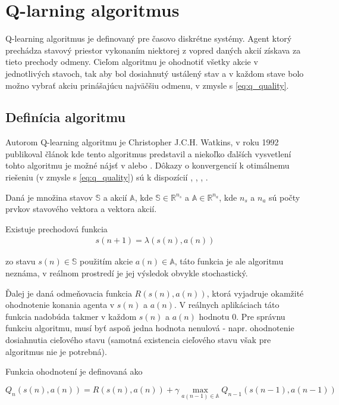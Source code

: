 \chapter{Q-larning algoritmus}

Q-learning algoritmus je definovaný pre časovo diskrétne systémy.
Agent ktorý prechádza stavový priestor vykonaním niektorej z vopred daných
akcií získava za tieto prechody odmeny. Cieľom algoritmu je ohodnotiť všetky akcie
v jednotlivých stavoch, tak aby bol dosiahnutý ustálený stav a v každom stave
bolo možno vybrať akciu prinášajúcu najväčšiu odmenu, v zmysle
s \ref{eq:q_quality}.


\section{Definícia algoritmu}

Autorom Q-learning algoritmu je Christopher J.C.H. Watkins, v roku 1992 publikoval
článok kde tento algoritmus predstavil \cite{bib:q_learning_watkins} a niekoľko ďalších
vysvetlení tohto algoritmu je možné nájsť v \cite{bib:q_tutorial_01} alebo
\cite{bib:q_tutorial_02}. Dôkazy o konvergencií k otimálnemu riešeniu (v zmysle
s \ref{eq:q_quality}) sú k dispozícií \cite{bib:q_proof_01}, \cite{bib:q_proof_02},
\cite{bib:q_proof_03}, \cite{bib:q_proof_04}.

Daná je množina stavov $\mathbb{S}$ a akcií $\mathbb{A}$, kde
 $\mathbb{S} \in \mathbb{R}^{n_s}$ a $\mathbb{A} \in \mathbb{R}^{n_a}$, kde
$n_s$ a  $n_a$ sú počty prvkov stavového vektora a vektora akcií.

Existuje prechodová funkcia
\begin{align}
        s(n+1) = \lambda(s(n), a(n))
\end{align}

zo stavu $s(n) \in \mathbb{S}$ použitím akcie $a(n) \in \mathbb{A}$, táto funkcia je ale algoritmu neznáma,
v reálnom prostredí je jej výsledok obvykle stochastický.

Ďalej je daná odmeňovacia funkcia $R(s(n),a(n))$, ktorá vyjadruje okamžité ohodnotenie konania
agenta v $s(n)$ a $a(n)$. V reálnych aplikáciach táto funkcia nadobúda takmer v každom
$s(n)$ a $a(n)$ hodnotu $0$. Pre správnu funkciu algoritmu, musí byť aspoň jedna hodnota
nenulová - napr. ohodnotenie dosiahnutia cieľového stavu (samotná existencia cieľového
stavu však pre algoritmus nie je potrebná).

Funkcia ohodnotení je definovaná ako

\begin{equation}
Q_{n}(s(n),a(n)) = R(s(n),a(n)) + \gamma \max_{a(n-1) \in \mathbb{A}} Q_{n-1}(s(n-1), a(n-1))
\label{eq:q_learning}
\end{equation}

